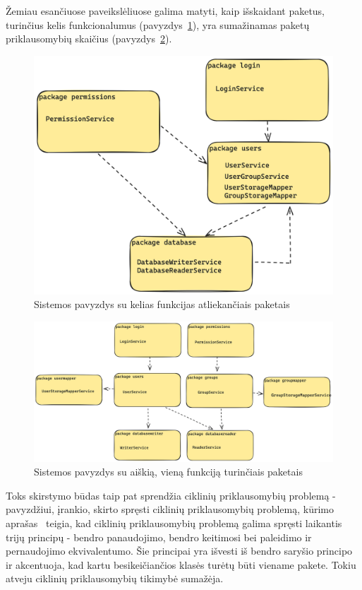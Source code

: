 Žemiau esančiuose paveikslėliuose galima matyti, kaip išskaidant paketus, turinčius kelis funkcionalumus (pavyzdys~\ref{img:excesive_deps}), yra sumažinamas paketų
priklausomybių skaičius (pavyzdys~\ref{img:good_deps}).
\begin{figure}[H]
    \centering
    \includegraphics[scale=0.15]{img/excesive_deps}
    \caption{Sistemos pavyzdys su kelias funkcijas atliekančiais paketais}
    \label{img:excesive_deps}
\end{figure}


\begin{figure}[H]
    \centering
    \includegraphics[scale=0.13]{img/good_deps}
    \caption{Sistemos pavyzdys su aiškią, vieną funkciją turinčiais paketais}
    \label{img:good_deps}
\end{figure}

Toks skirstymo būdas taip pat sprendžia ciklinių priklausomybių problemą - pavyzdžiui, įrankio, skirto spręsti ciklinių priklausomybių problemą,
kūrimo aprašas~\cite{CircularDependencies} teigia, kad ciklinių priklausomybių problemą galima spręsti laikantis trijų principų -
bendro panaudojimo, bendro keitimosi bei paleidimo ir pernaudojimo ekvivalentumo.
Šie principai yra išvesti iš bendro saryšio principo ir akcentuoja, kad kartu besikeičiančios klasės turėtų būti viename pakete.
Tokiu atveju ciklinių priklausomybių tikimybė sumažėja.

